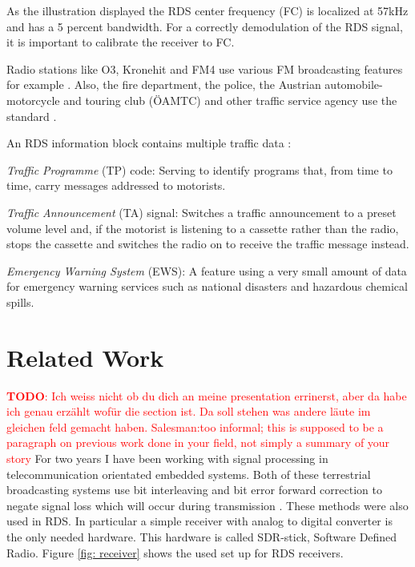 \documentclass[conference,11pt,a4paper]{IEEEtran}
\newcommand{\todo}[1]{\textcolor{red}{\textbf{TODO}: #1}}
\begin{document}
	As the illustration displayed the RDS center frequency (FC) is localized at 57kHz and has a 5 percent bandwidth. For a correctly demodulation of the RDS signal, it is important to calibrate the receiver to FC.
	
	Radio stations like O3, Kronehit and FM4 use various FM broadcasting features for example \cite{Stau}. Also, the fire department, the police, the Austrian automobile- motorcycle and touring club (ÖAMTC) and other traffic service agency use the standard \cite{standard}.
	
	An RDS information block contains multiple traffic data \cite{Dietman}: 
	
	\textit{Traffic Programme} (TP) code: Serving to identify programs that, from time to time, carry messages addressed to motorists.
	
	\textit{Traffic Announcement} (TA) signal: Switches a traffic announcement to a preset volume level and, if the motorist is listening to a cassette rather than the radio, stops the cassette and switches the radio on to receive the traffic message instead.
	
	\textit{Emergency Warning System} (EWS): A feature using a very small amount of data for emergency warning services such as national disasters and hazardous chemical spills.
	\\
	
	
	\section{Related Work}
	\todo{Ich weiss nicht ob du dich an meine presentation errinerst, aber da habe ich genau erzählt wofür die section ist. Da soll stehen was andere läute im gleichen feld gemacht haben. Salesman:too informal; this is supposed to be a paragraph on previous work done in your field, not simply a summary of your story}
	For two years I have been working with signal processing in telecommunication orientated embedded systems. Both of these terrestrial broadcasting systems use bit interleaving and bit error forward correction to negate signal loss which will occur during transmission \cite{Terre}. These methods were also used in RDS. In particular a simple receiver with analog to digital converter is the only needed hardware. This hardware is called SDR-stick, Software Defined Radio. Figure \ref{fig: receiver} shows the used set up for RDS receivers.
	
\end{document}
